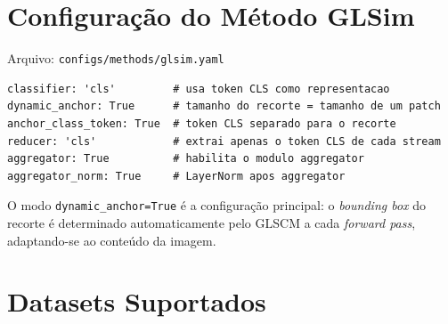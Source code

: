 \documentclass[a4paper,12pt]{scrartcl}
\begin{document}
\section{Configura\c{c}\~ao do M\'etodo GLSim}

Arquivo: \texttt{configs/methods/glsim.yaml}

\begin{lstlisting}[style=yamlstyle,
  caption={Configura\c{c}\~ao principal do m\'etodo GLSim}]
classifier: 'cls'         # usa token CLS como representacao
dynamic_anchor: True      # tamanho do recorte = tamanho de um patch
anchor_class_token: True  # token CLS separado para o recorte
reducer: 'cls'            # extrai apenas o token CLS de cada stream
aggregator: True          # habilita o modulo aggregator
aggregator_norm: True     # LayerNorm apos aggregator
\end{lstlisting}

O modo \texttt{dynamic\_anchor=True} \'e a configura\c{c}\~ao principal: o
\textit{bounding box} do recorte \'e determinado automaticamente pelo GLSCM a
cada \textit{forward pass}, adaptando-se ao conte\'udo da imagem.

\section{Datasets Suportados}
\end{document}
